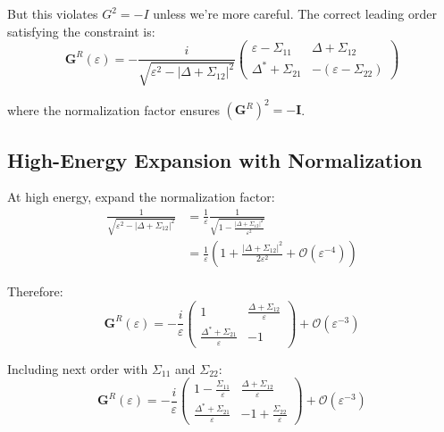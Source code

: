 \documentclass[12pt]{article}
\begin{document}
But this violates $G^2 = -I$ unless we're more careful. The correct leading order satisfying the constraint is:
\begin{equation}
\boxed{
\mathbf{G}^R(\varepsilon) = -\frac{i}{\sqrt{\varepsilon^2 - |\Delta + \Sigma_{12}|^2}}\begin{pmatrix}
\varepsilon - \Sigma_{11} & \Delta + \Sigma_{12} \\
\Delta^* + \Sigma_{21} & -(\varepsilon - \Sigma_{22})
\end{pmatrix}
}
\end{equation}

where the normalization factor ensures $(\mathbf{G}^R)^2 = -\mathbf{I}$.

\subsection{High-Energy Expansion with Normalization}

At high energy, expand the normalization factor:
\begin{align}
\frac{1}{\sqrt{\varepsilon^2 - |\Delta + \Sigma_{12}|^2}} &= \frac{1}{\varepsilon}\frac{1}{\sqrt{1 - \frac{|\Delta + \Sigma_{12}|^2}{\varepsilon^2}}} \\
&= \frac{1}{\varepsilon}\left(1 + \frac{|\Delta + \Sigma_{12}|^2}{2\varepsilon^2} + \mathcal{O}(\varepsilon^{-4})\right)
\end{align}

Therefore:
\begin{equation}
\boxed{
\mathbf{G}^R(\varepsilon) = -\frac{i}{\varepsilon}\begin{pmatrix}
1 & \frac{\Delta + \Sigma_{12}}{\varepsilon} \\
\frac{\Delta^* + \Sigma_{21}}{\varepsilon} & -1
\end{pmatrix} + \mathcal{O}(\varepsilon^{-3})
}
\end{equation}

Including next order with $\Sigma_{11}$ and $\Sigma_{22}$:
\begin{equation}
\boxed{
\mathbf{G}^R(\varepsilon) = -\frac{i}{\varepsilon}\begin{pmatrix}
1 - \frac{\Sigma_{11}}{\varepsilon} & \frac{\Delta + \Sigma_{12}}{\varepsilon} \\
\frac{\Delta^* + \Sigma_{21}}{\varepsilon} & -1 + \frac{\Sigma_{22}}{\varepsilon}
\end{pmatrix} + \mathcal{O}(\varepsilon^{-3})
}
\end{equation}
\end{document}
